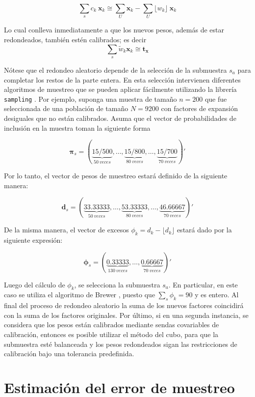 \documentclass[
  12pt,
]{book}
\begin{document}
\[
\sum_s c_k \ \mathbf{x}_k 
\cong \sum_U \mathbf{x}_k 
- \sum_U \lfloor w_k \rfloor \ \mathbf{x}_k 
\]

Lo cual conlleva inmediatamente a que los nuevos pesos, además de estar redondeados, también estén calibrados; es decir
\[
\sum_s \tilde w_k \mathbf{x}_k \cong  \mathbf{t_x}
\]

Nótese que el redondeo aleatorio depende de la selección de la submuestra \(s_a\) para completar los restos de la parte entera. En esta selección intervienen diferentes algoritmos de muestreo que se pueden aplicar fácilmente utilizando la librería \texttt{sampling} \citep{Matei}. Por ejemplo, suponga una muestra de tamaño \(n= 200\) que fue seleccionada de una población de tamaño \(N=9200\) con factores de expansión desiguales que no están calibrados. Asuma que el vector de probabilidades de inclusión en la muestra toman la siguiente forma

\[
\boldsymbol{\pi}_s = (\underbrace{15/500}_{50 \ veces},
\ldots,
\underbrace{15/800}_{80 \ veces}, 
\ldots,
\underbrace{15/700}_{70 \ veces})'
\]

Por lo tanto, el vector de pesos de muestreo estará definido de la siguiente manera:

\[
\mathbf{d}_s = (\underbrace{33.33333}_{50 \ veces},
\ldots,
\underbrace{53.33333}_{80 \ veces}, 
\ldots,
\underbrace{46.66667}_{70 \ veces})'
\]

De la misma manera, el vector de excesos \(\phi_k = d_k - \lfloor d_k \rfloor\) estará dado por la siguiente expresión:

\[
\boldsymbol{\phi}_s = (\underbrace{0.33333}_{130 \ veces},
\ldots,
\underbrace{0.66667}_{70 \ veces})'
\]

Luego del cálculo de \(\phi_k\), se selecciona la submuestra \(s_a\). En particular, en este caso se utiliza el algoritmo de Brewer \citep{Gutierrez_2016}, puesto que \(\sum_s\phi_k = 90\) y es entero. Al final del proceso de redondeo aleatorio la suma de los nuevos factores coincidirá con la suma de los factores originales. Por último, si en una segunda instancia, se considera que los pesos están calibrados mediante sendas covariables de calibración, entonces es posible utilizar el método del cubo, para que la submuestra esté balanceada y los pesos redondeados sigan las restricciones de calibración bajo una tolerancia predefinida.

\hypertarget{estimaciuxf3n-del-error-de-muestreo}{%
\chapter{Estimación del error de muestreo}\label{estimaciuxf3n-del-error-de-muestreo}}
\end{document}
